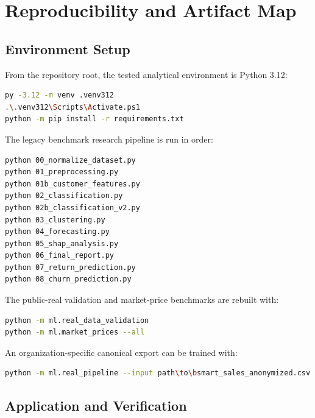 \chapter{Reproducibility and Artifact Map}
\label{appendix_reproducibility}

\section{Environment Setup}

From the repository root, the tested analytical environment is Python 3.12:

\begin{lstlisting}[language=bash,caption={Create the analytical environment.}]
py -3.12 -m venv .venv312
.\.venv312\Scripts\Activate.ps1
python -m pip install -r requirements.txt
\end{lstlisting}

The legacy benchmark research pipeline is run in order:

\begin{lstlisting}[language=bash,caption={Rebuild the legacy benchmark artifacts.}]
python 00_normalize_dataset.py
python 01_preprocessing.py
python 01b_customer_features.py
python 02_classification.py
python 02b_classification_v2.py
python 03_clustering.py
python 04_forecasting.py
python 05_shap_analysis.py
python 06_final_report.py
python 07_return_prediction.py
python 08_churn_prediction.py
\end{lstlisting}

The public-real validation and market-price benchmarks are rebuilt with:

\begin{lstlisting}[language=bash,caption={Rebuild the public-real experiments.}]
python -m ml.real_data_validation
python -m ml.market_prices --all
\end{lstlisting}

An organization-specific canonical export can be trained with:

\begin{lstlisting}[language=bash,caption={Train on a canonical SME export.}]
python -m ml.real_pipeline --input path\to\bsmart_sales_anonymized.csv
\end{lstlisting}

\section{Application and Verification}

